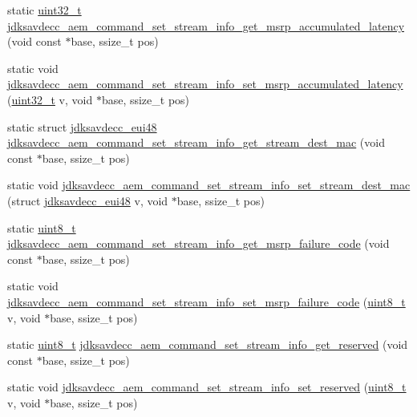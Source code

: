 \begin{DoxyCompactItemize}
\item 
static \hyperlink{parse_8c_a6eb1e68cc391dd753bc8ce896dbb8315}{uint32\+\_\+t} \hyperlink{group__command__set__stream__info_gadfe59a7c594ac051228abcd9946153ce}{jdksavdecc\+\_\+aem\+\_\+command\+\_\+set\+\_\+stream\+\_\+info\+\_\+get\+\_\+msrp\+\_\+accumulated\+\_\+latency} (void const $\ast$base, ssize\+\_\+t pos)
\item 
static void \hyperlink{group__command__set__stream__info_gadd7a760f1d47f548619b12744c2ca631}{jdksavdecc\+\_\+aem\+\_\+command\+\_\+set\+\_\+stream\+\_\+info\+\_\+set\+\_\+msrp\+\_\+accumulated\+\_\+latency} (\hyperlink{parse_8c_a6eb1e68cc391dd753bc8ce896dbb8315}{uint32\+\_\+t} v, void $\ast$base, ssize\+\_\+t pos)
\item 
static struct \hyperlink{structjdksavdecc__eui48}{jdksavdecc\+\_\+eui48} \hyperlink{group__command__set__stream__info_gaaa0c183cf50d8b2f3f785a61cd45180c}{jdksavdecc\+\_\+aem\+\_\+command\+\_\+set\+\_\+stream\+\_\+info\+\_\+get\+\_\+stream\+\_\+dest\+\_\+mac} (void const $\ast$base, ssize\+\_\+t pos)
\item 
static void \hyperlink{group__command__set__stream__info_ga0095e991de1df0a75ef0573edb304406}{jdksavdecc\+\_\+aem\+\_\+command\+\_\+set\+\_\+stream\+\_\+info\+\_\+set\+\_\+stream\+\_\+dest\+\_\+mac} (struct \hyperlink{structjdksavdecc__eui48}{jdksavdecc\+\_\+eui48} v, void $\ast$base, ssize\+\_\+t pos)
\item 
static \hyperlink{stdint_8h_aba7bc1797add20fe3efdf37ced1182c5}{uint8\+\_\+t} \hyperlink{group__command__set__stream__info_ga40f005401edeeb49e4ce00b9ba47cc9b}{jdksavdecc\+\_\+aem\+\_\+command\+\_\+set\+\_\+stream\+\_\+info\+\_\+get\+\_\+msrp\+\_\+failure\+\_\+code} (void const $\ast$base, ssize\+\_\+t pos)
\item 
static void \hyperlink{group__command__set__stream__info_ga80d67b8367dcec40d0dfc37700770a0f}{jdksavdecc\+\_\+aem\+\_\+command\+\_\+set\+\_\+stream\+\_\+info\+\_\+set\+\_\+msrp\+\_\+failure\+\_\+code} (\hyperlink{stdint_8h_aba7bc1797add20fe3efdf37ced1182c5}{uint8\+\_\+t} v, void $\ast$base, ssize\+\_\+t pos)
\item 
static \hyperlink{stdint_8h_aba7bc1797add20fe3efdf37ced1182c5}{uint8\+\_\+t} \hyperlink{group__command__set__stream__info_gab949cdc2b67e61684f0467c249d541f2}{jdksavdecc\+\_\+aem\+\_\+command\+\_\+set\+\_\+stream\+\_\+info\+\_\+get\+\_\+reserved} (void const $\ast$base, ssize\+\_\+t pos)
\item 
static void \hyperlink{group__command__set__stream__info_ga4b23b322aa6b91df885c019cd10401ef}{jdksavdecc\+\_\+aem\+\_\+command\+\_\+set\+\_\+stream\+\_\+info\+\_\+set\+\_\+reserved} (\hyperlink{stdint_8h_aba7bc1797add20fe3efdf37ced1182c5}{uint8\+\_\+t} v, void $\ast$base, ssize\+\_\+t pos)

\end{DoxyCompactItemize}
